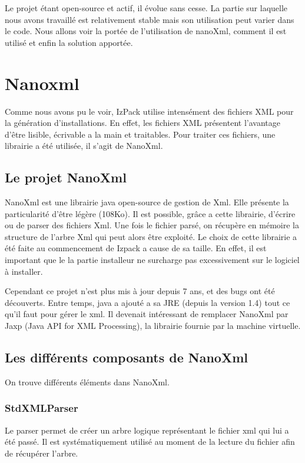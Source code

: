 Le projet étant open-source et actif, il évolue sans cesse. La partie sur laquelle nous avons travaillé est relativement stable mais son utilisation peut varier dans le code. Nous allons voir la portée de l'utilisation de nanoXml, comment il est utilisé et enfin la solution apportée.

\section{Nanoxml}
Comme nous avons pu le voir, IzPack utilise intensément des fichiers XML pour la génération d'installations.
En effet, les fichiers XML présentent l'avantage d'être lisible, écrivable a la main et traitables.
Pour traiter ces fichiers, une librairie a été utilisée, il s'agit de NanoXml.
\subsection{Le projet NanoXml}
NanoXml est une librairie java open-source de gestion de Xml.
Elle présente la particularité d'être légère (108Ko). 
Il est possible, grâce a cette librairie, d'écrire ou de parser des fichiers Xml.
Une fois le fichier parsé, on récupère en mémoire la structure de l'arbre Xml qui peut alors être exploité.
Le choix de cette librairie a été faite au commencement de Izpack a cause de sa taille.
En effet, il est important que le la partie installeur ne surcharge pas excessivement sur le logiciel à installer.

Cependant ce projet n'est plus mis à jour depuis 7 ans, et des bugs ont été découverts.
Entre temps, java a ajouté a sa JRE (depuis la version 1.4) tout ce qu'il faut pour gérer le xml.
Il devenait intéressant de remplacer NanoXml par Jaxp (Java API for XML Processing), la librairie fournie par la machine virtuelle.
\subsection{Les différents composants de NanoXml}
On trouve différents éléments dans NanoXml.
\subsubsection{StdXMLParser}
Le parser permet de créer un arbre logique représentant le fichier xml qui lui a été passé.
Il est systématiquement utilisé au moment de la lecture du fichier afin de récupérer l'arbre.
